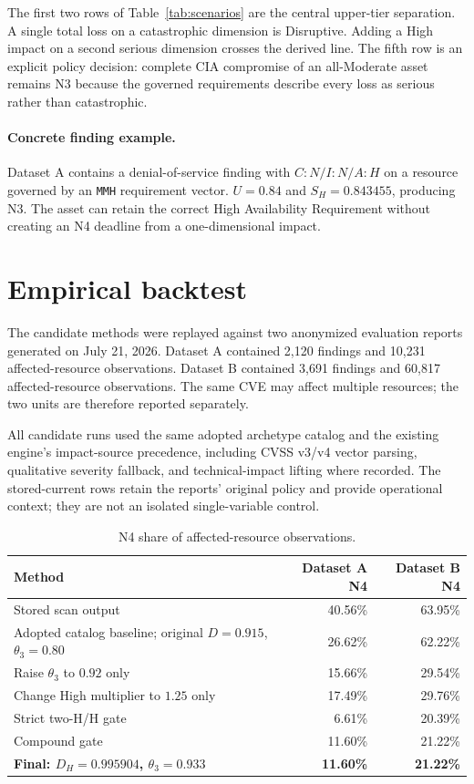 \documentclass[11pt]{article}
\newcommand{\code}[1]{\texttt{#1}}
\begin{document}
The first two rows of Table~\ref{tab:scenarios} are the central upper-tier
separation. A single total loss on a
catastrophic dimension is Disruptive. Adding a High impact on a second serious
dimension crosses the derived line. The fifth row is an explicit policy decision:
complete CIA compromise of an all-Moderate asset remains N3 because the governed
requirements describe every loss as serious rather than catastrophic.

\paragraph{Concrete finding example.}
Dataset A contains a denial-of-service finding with $C{:}N/I{:}N/A{:}H$ on a
resource governed by an \code{MMH} requirement vector. $U=0.84$ and
$S_H=0.843455$, producing N3. The asset can retain the correct High Availability
Requirement without creating an N4 deadline from a one-dimensional impact.

\section{Empirical backtest}
\label{sec:backtest}

The candidate methods were replayed against two anonymized evaluation reports
generated on July 21, 2026. Dataset A contained 2,120 findings and 10,231
affected-resource observations. Dataset B contained 3,691 findings and
60,817 affected-resource observations. The same CVE may affect multiple resources;
the two units are therefore reported separately.

All candidate runs used the same adopted archetype catalog and the existing
engine's impact-source precedence, including CVSS v3/v4 vector parsing, qualitative
severity fallback, and technical-impact lifting where recorded. The stored-current
rows retain the reports' original policy and provide operational context; they are
not an isolated single-variable control.

\begin{table}[H]
\centering
\small
\renewcommand{\arraystretch}{1.15}
\begin{tabular}{@{}lrr@{}}
\toprule
\textbf{Method} & \textbf{Dataset A N4} & \textbf{Dataset B N4} \\
\midrule
Stored scan output & 40.56\% & 63.95\% \\
Adopted catalog baseline; original $D=0.915$, $\theta_3=0.80$ & 26.62\% & 62.22\% \\
Raise $\theta_3$ to $0.92$ only & 15.66\% & 29.54\% \\
Change High multiplier to $1.25$ only & 17.49\% & 29.76\% \\
Strict two-H/H gate & 6.61\% & 20.39\% \\
Compound gate & 11.60\% & 21.22\% \\
\textbf{Final: $D_H=0.995904$, $\theta_3=0.933$} & \textbf{11.60\%} & \textbf{21.22\%} \\
\bottomrule
\end{tabular}
\caption{N4 share of affected-resource observations.}
\label{tab:affected-n4}
\end{table}
\end{document}
